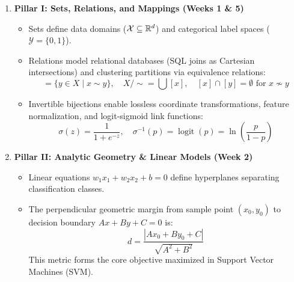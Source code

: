 \begin{enumerate}
    \item \textbf{Pillar I: Sets, Relations, and Mappings (Weeks 1 \& 5)}
    \begin{itemize}
        \item Sets define data domains ($\mathcal{X} \subseteq \mathbb{R}^d$) and categorical label spaces ($\mathcal{Y} = \{0, 1\}$).
        \item Relations model relational databases (SQL joins as Cartesian intersections) and clustering partitions via equivalence relations:
        \begin{equation}
        [x] = \{y \in X \mid x \sim y\}, \quad X / \sim = \bigcup [x], \quad [x] \cap [y] = \emptyset \text{ for } x \not\sim y
        \end{equation}
        \item Invertible bijections enable lossless coordinate transformations, feature normalization, and logit-sigmoid link functions:
        \begin{equation}
        \sigma(z) = \frac{1}{1 + e^{-z}}, \quad \sigma^{-1}(p) = \operatorname{logit}(p) = \ln\left(\frac{p}{1 - p}\right)
        \end{equation}
    \end{itemize}

    \item \textbf{Pillar II: Analytic Geometry \& Linear Models (Week 2)}
    \begin{itemize}
        \item Linear equations $w_1 x_1 + w_2 x_2 + b = 0$ define hyperplanes separating classification classes.
        \item The perpendicular geometric margin from sample point $(x_0, y_0)$ to decision boundary $Ax + By + C = 0$ is:
        \begin{equation}
        d = \frac{|Ax_0 + By_0 + C|}{\sqrt{A^2 + B^2}}
        \end{equation}
        This metric forms the core objective maximized in Support Vector Machines (SVM).
    \end{itemize}


\end{enumerate}
